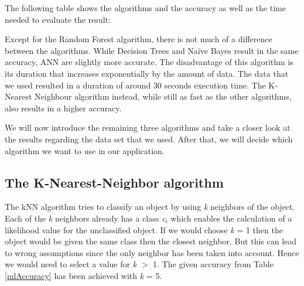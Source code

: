 The following table shows the algorithms and the accuracy as well as the time needed to evaluate the result:

\begin{table}[!htb]
\centering
{}
\caption{Accuracy of different Machine Learning algorithms}
\label{mlAccuracy}
\end{table}

Except for the Random Forest algorithm, there is not much of a difference between the algorithms. While Decision Trees and Na{\"i}ve Bayes result in the same accuracy, ANN are slightly more accurate. The disadvantage of this algorithm is its duration that increases exponentially by the amount of data. The data that we used resulted in a duration of around 30 seconds execution time. The K-Nearest Neighbour algorithm instead, while still as fast as the other algorithms, also results in a higher accuracy.

We will now introduce the remaining three algorithms and take a closer look at the results regarding the data set that we used. After that, we will decide which algorithm we want to use in our application.

\subsection{The K-Nearest-Neighbor algorithm}
\label{sec4.2.1}
The kNN algorithm tries to classify an object by using \emph{k} neighbors of the object. Each of the \emph{k} neighbors already has a class \emph{c$_i$} which enables the calculation of a likelihood value for the unclassified object.
If we would choose \emph{k} = 1 then the object would be given the same class then the closest neighbor. But this can lead to wrong assumptions since the only neighbor has been taken into account. Hence we would need to select a value for \emph{k} $>$ 1. The given accuracy from Table \ref{mlAccuracy} has been achieved with \emph{k} = 5.


